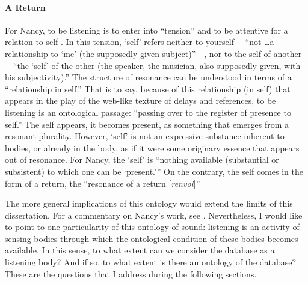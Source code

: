 \paragraph{A Return}
For Nancy, to be listening is to enter into ``tension'' and to be attentive for a relation to self \parencite[12][All subsequent quotes from this passage.]{Nan07:Lis}. In this tension, `self' refers neither to yourself ---``not \dots a relationship to `me' (the supposedly given subject)''---, nor to the self of another ---``the `self' of the other (the speaker, the musician, also supposedly given, with his subjectivity).'' The structure of resonance can be understood in terms of a ``relationship in self.'' That is to say, because of this relationship (in self) that appears in the play of the web-like texture of delays and references, to be listening is an ontological passage: ``passing over to the register of presence to self.'' The self appears, it becomes present, as something that emerges from a resonant plurality. However, `self' is not an expressive substance inherent to bodies, or already in the body, as if it were some originary essence that appears out of resonance. For Nancy, the `self' is ``nothing available (substantial or subsistent) to which one can be `present.''' On the contrary, the self comes in the form of a return, the ``resonance of a return [\textit{renvoi}]''  

The more general implications of this ontology would extend the limits of this dissertation. For a commentary on Nancy's work, see \textcite{Gra15:The}. Nevertheless, I would like to point to one particularity of this ontology of sound: listening is an activity of sensing bodies through which the ontological condition of these bodies becomes available. In this sense, to what extent can we consider the database as a listening body? And if so, to what extent is there an ontology of the database? These are the questions that I address during the following sections.

